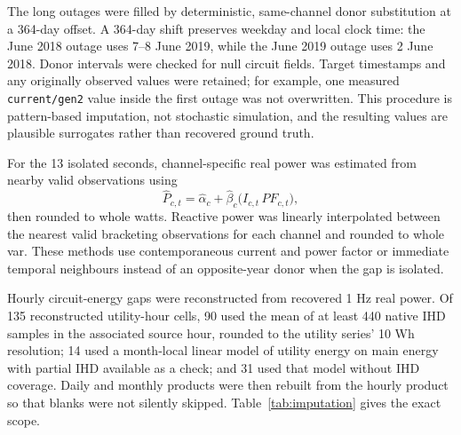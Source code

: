 \documentclass{IEEEoj-data}
\begin{document}
The long outages were filled by deterministic, same-channel donor substitution at a 364-day offset. A 364-day shift preserves weekday and local clock time: the June 2018 outage uses 7--8 June 2019, while the June 2019 outage uses 2 June 2018. Donor intervals were checked for null circuit fields. Target timestamps and any originally observed values were retained; for example, one measured \texttt{current/gen2} value inside the first outage was not overwritten. This procedure is pattern-based imputation, not stochastic simulation, and the resulting values are plausible surrogates rather than recovered ground truth.

For the 13 isolated seconds, channel-specific real power was estimated from nearby valid observations using
\begin{equation}
    \widehat{P}_{c,t}=\widehat{\alpha}_{c}+\widehat{\beta}_{c}\bigl(I_{c,t}\,PF_{c,t}\bigr),
    \label{eq:localpower}
\end{equation}
then rounded to whole watts. Reactive power was linearly interpolated between the nearest valid bracketing observations for each channel and rounded to whole var. These methods use contemporaneous current and power factor or immediate temporal neighbours instead of an opposite-year donor when the gap is isolated.

Hourly circuit-energy gaps were reconstructed from recovered 1 Hz real power. Of 135 reconstructed utility-hour cells, 90 used the mean of at least 440 native IHD samples in the associated source hour, rounded to the utility series' 10 Wh resolution; 14 used a month-local linear model of utility energy on main energy with partial IHD available as a check; and 31 used that model without IHD coverage. Daily and monthly products were then rebuilt from the hourly product so that blanks were not silently skipped. Table~\ref{tab:imputation} gives the exact scope.
\end{document}
